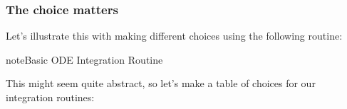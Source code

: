 \documentclass[letterpaper,10pt,english]{jupyterBook}
\begin{document}
\subsubsection{The choice matters}
\label{\detokenize{content/1_modeling/SHO-numerical:the-choice-matters}}
\sphinxAtStartPar
Let’s illustrate this with making different choices using the following routine:

\begin{sphinxadmonition}{note}{Basic ODE Integration Routine}

\begin{sphinxVerbatim}[commandchars=\\\{\}]
  
  
  

  
  
   
  

  

   

      
      
      
    
    
      
\end{sphinxVerbatim}
\end{sphinxadmonition}

\begin{sphinxVerbatim}[commandchars=\\\{\}]

\end{sphinxVerbatim}

\sphinxAtStartPar
This might seem quite abstract, so let’s make a table of choices for our integration routines:
\end{document}
